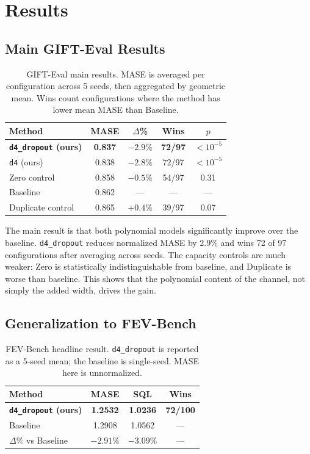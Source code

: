 \documentclass[11pt]{article}
\begin{document}
\section{Results}

\subsection{Main GIFT-Eval Results}

\begin{table}[H]
\centering
\caption{GIFT-Eval main results. MASE is averaged per configuration across 5 seeds, then aggregated by geometric mean. Wins count configurations where the method has lower mean MASE than Baseline.}
\begin{tabular}{lcccc}
\toprule
Method & MASE & $\Delta$\% & Wins & $p$ \\
\midrule
\textbf{\texttt{d4\_dropout} (ours)} & \textbf{0.837} & \textbf{$-2.9\%$} & \textbf{72/97} & $<10^{-5}$ \\
\texttt{d4} (ours) & 0.838 & $-2.8\%$ & 72/97 & $<10^{-5}$ \\
Zero control & 0.858 & $-0.5\%$ & 54/97 & 0.31 \\
Baseline & 0.862 & --- & --- & --- \\
Duplicate control & 0.865 & $+0.4\%$ & 39/97 & 0.07 \\
\bottomrule
\end{tabular}
\label{tab:main}
\end{table}

The main result is that both polynomial models significantly improve over the baseline. \texttt{d4\_dropout} reduces normalized MASE by 2.9\% and wins 72 of 97 configurations after averaging across seeds. The capacity controls are much weaker: Zero is statistically indistinguishable from baseline, and Duplicate is worse than baseline. This shows that the polynomial content of the channel, not simply the added width, drives the gain.

\subsection{Generalization to FEV-Bench}

\begin{table}[H]
\centering
\caption{FEV-Bench headline result. \texttt{d4\_dropout} is reported as a 5-seed mean; the baseline is single-seed. MASE here is unnormalized.}
\begin{tabular}{lccc}
\toprule
Method & MASE & SQL & Wins \\
\midrule
\textbf{\texttt{d4\_dropout} (ours)} & \textbf{1.2532} & \textbf{1.0236} & \textbf{72/100} \\
Baseline & 1.2908 & 1.0562 & --- \\
$\Delta$\% vs Baseline & $-2.91\%$ & $-3.09\%$ & --- \\
\bottomrule
\end{tabular}
\label{tab:fev}
\end{table}
\end{document}
